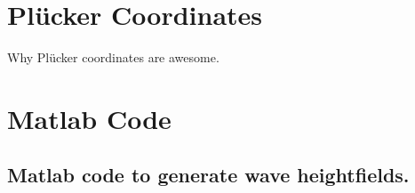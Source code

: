 
\chapter{Plücker Coordinates}

Why Plücker coordinates are awesome.

\chapter{Matlab Code}
\label{lbl_code1}

\section{Matlab code to generate wave heightfields.}










